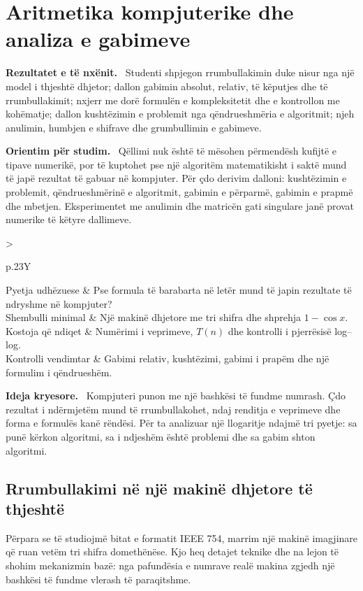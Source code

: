 \documentclass[11pt,oneside,openany]{book}
\newenvironment{qellime}{\par\medskip\noindent\textbf{Rezultatet e të nxënit.}\ }{\par\medskip}
\newenvironment{orientim}{\par\medskip\noindent\textbf{Orientim për studim.}\ }{\par\medskip}
\newenvironment{ideja}{\par\medskip\noindent\textbf{Ideja kryesore.}\ }{\par\medskip}
\newcommand{\hartakapitullit}[4]{%
\par\smallskip
\noindent\begin{tabularx}{\textwidth}{>{\bfseries\raggedright\arraybackslash}p{.23\textwidth}Y}
Pyetja udhëzuese & #1\\
Shembulli minimal & #2\\
Kostoja që ndiqet & #3\\
Kontrolli vendimtar & #4
\end{tabularx}\par\medskip}
\begin{document}




\chapter{Aritmetika kompjuterike dhe analiza e gabimeve}
\begin{qellime}
Studenti shpjegon rrumbullakimin duke nisur nga një model i thjeshtë dhjetor; dallon gabimin absolut, relativ, të këputjes dhe të rrumbullakimit; nxjerr me dorë formulën e kompleksitetit dhe e kontrollon me kohëmatje; dallon kushtëzimin e problemit nga qëndrueshmëria e algoritmit; njeh anulimin, humbjen e shifrave dhe grumbullimin e gabimeve.
\end{qellime}

\begin{orientim}
Qëllimi nuk është të mësohen përmendësh kufijtë e tipave numerikë, por të
kuptohet pse një algoritëm matematikisht i saktë mund të japë rezultat të
gabuar në kompjuter. Për çdo derivim dalloni: kushtëzimin e problemit,
qëndrueshmërinë e algoritmit, gabimin e përparmë, gabimin e prapmë dhe
mbetjen. Eksperimentet me anulimin dhe matricën gati singulare janë provat
numerike të këtyre dallimeve.
\end{orientim}

\hartakapitullit
{Pse formula të barabarta në letër mund të japin rezultate të ndryshme në kompjuter?}
{Një makinë dhjetore me tri shifra dhe shprehja $1-\cos x$.}
{Numërimi i veprimeve, $T(n)$ dhe kontrolli i pjerrësisë log--log.}
{Gabimi relativ, kushtëzimi, gabimi i prapëm dhe një formulim i qëndrueshëm.}

\begin{ideja}
Kompjuteri punon me një bashkësi të fundme numrash. Çdo rezultat i ndërmjetëm
mund të rrumbullakohet, ndaj renditja e veprimeve dhe forma e formulës kanë
rëndësi. Për ta analizuar një llogaritje ndajmë tri pyetje: sa punë kërkon
algoritmi, sa i ndjeshëm është problemi dhe sa gabim shton algoritmi.
\end{ideja}



\section{Rrumbullakimi në një makinë dhjetore të thjeshtë}
Përpara se të studiojmë bitat e formatit IEEE 754, marrim një makinë
imagjinare që ruan vetëm tri shifra domethënëse. Kjo heq detajet teknike dhe
na lejon të shohim mekanizmin bazë: nga pafundësia e numrave realë makina
zgjedh një bashkësi të fundme vlerash të paraqitshme.
\end{document}
